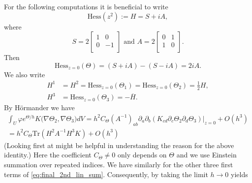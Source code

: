 \documentclass[12pt]{amsart}
\def\p{\partial}
\def\R{\mathbb R}
\theoremstyle{definition}
\theoremstyle{remark}
\newcommand{\x}{\vec{x}}
\begin{document}
For the following computations it is beneficial to write
\[
 \text{Hess}(z^2):=H=S+iA,
\]
where 
\[
 S=2
  \left[ {\begin{array}{cc}
   1 & 0 \\
   0 & -1 \\
  \end{array} } \right] \text{ and } A  =2\left[ {\begin{array}{cc}
   0 & 1 \\
   1 & 0 \\
  \end{array} } \right].
\]
Then 
\[
 \text{Hess}_{z=0}(\Theta)=(S+iA)-(S-iA)=2i A.
\]
We also write 
\begin{align*}
 H^{1}&=H^{2}=\text{Hess}_{z=0}(\Theta_1)=\text{Hess}_{z=0}(\Theta_2)=\frac{1}{2}H, \\
 H^{3}&=\text{Hess}_{z=0}(\Theta_3)=-\overline H.
\end{align*}
% 
% 
% 
% 
By H\"ormander \cite[Theorem 7.7.5]{hormander2015analysis}  we have 
\begin{multline*}
 \int_{U} \varphi e^{\Theta/h} K(\nabla \Theta_2,\nabla \Theta_3\big)dV=h^2C_\Theta (A^{-1})_{ab}\p_a\p_b(K_{cd}\p_c\Theta_2 \p_d\Theta_3)|_{z=0}+O(h^3) \\
 =h^2C_\Theta \text{Tr}(H^2A^{-1}H^3K)+O(h^3)
 \end{multline*}
(Looking first at \cite[Lemma 7.7.3]{hormander2015analysis} might be helpful in understanding the reason for the above identity.) 
Here the coefficient $C_\Theta\neq 0$ only depends on $\Theta$ and we use Einstein summation over repeated indices. We have similarly for the other three first terms of \eqref{eq:final_2nd_lin_sum}. Consequently, by taking the limit $h\to 0$ yields 
\end{document}
